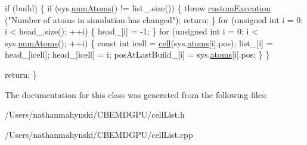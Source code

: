 \begin{DoxyCode}
    \textcolor{keywordflow}{if} (build) \{
        \textcolor{keywordflow}{if} (sys.\hyperlink{classsystem_definition_ae8d3c2df2d56241cee03fcc4e2026ae0}{numAtoms}() != list\_.size()) \{
            \textcolor{keywordflow}{throw} \hyperlink{classcustom_exception}{customException} (\textcolor{stringliteral}{"Number of atoms in
       simulation has changed"});
            \textcolor{keywordflow}{return};
        \}
        \textcolor{keywordflow}{for} (\textcolor{keywordtype}{unsigned} \textcolor{keywordtype}{int} i = 0; i < head\_.size(); ++i) \{
            head\_[i] = -1;
        \}
            \textcolor{keywordflow}{for} (\textcolor{keywordtype}{unsigned} \textcolor{keywordtype}{int} i = 0; i < sys.\hyperlink{classsystem_definition_ae8d3c2df2d56241cee03fcc4e2026ae0}{numAtoms}(); ++i) \{
                \textcolor{keyword}{const} \textcolor{keywordtype}{int} icell = \hyperlink{classcell_list__cpu_a564d95c9bd7af0829291789d173361e0}{cell}(sys.\hyperlink{classsystem_definition_ae8814d3f60fc1111af2a3f218a4bfcab}{atoms}[i].pos);
                list\_[i] = head\_[icell];
                head\_[icell] = i;
                posAtLastBuild\_[i] = sys.\hyperlink{classsystem_definition_ae8814d3f60fc1111af2a3f218a4bfcab}{atoms}[i].pos;
            \}
    \} 

    \textcolor{keywordflow}{return};
\}
\end{DoxyCode}


The documentation for this class was generated from the following files\-:\begin{DoxyCompactItemize}
\item 
/\-Users/nathanmahynski/\-C\-B\-E\-M\-D\-G\-P\-U/cell\-List.\-h\item 
/\-Users/nathanmahynski/\-C\-B\-E\-M\-D\-G\-P\-U/cell\-List.\-cpp\end{DoxyCompactItemize}
